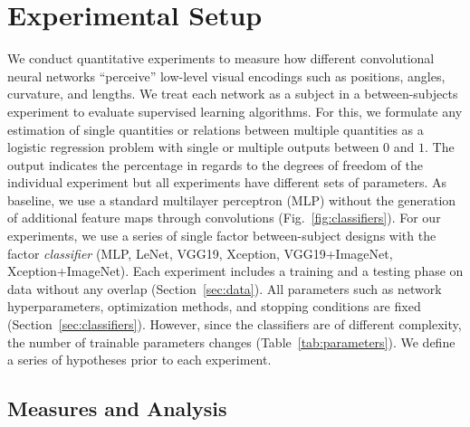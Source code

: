 
\section{Experimental Setup}

We conduct quantitative experiments to measure how different convolutional neural networks ``perceive'' low-level visual encodings such as positions, angles, curvature, and lengths. We treat each network as a subject in a between-subjects experiment to evaluate supervised learning algorithms. For this, we formulate any estimation of single quantities or relations between multiple quantities as a logistic regression problem with single or multiple outputs between $0$ and $1$. The output indicates the percentage in regards to the degrees of freedom of the individual experiment but all experiments have different sets of parameters. As baseline, we use a standard multilayer perceptron (MLP) without the generation of additional feature maps through convolutions (Fig.~\ref{fig:classifiers}).
For our experiments, we use a series of single factor between-subject designs with the factor \emph{classifier} (MLP, LeNet, VGG19, Xception, VGG19+ImageNet, Xception+ImageNet). Each experiment includes a training and a testing phase on data without any overlap (Section~\ref{sec:data}). All parameters such as network hyperparameters, optimization methods, and stopping conditions are fixed (Section~\ref{sec:classifiers}). However, since the classifiers are of different complexity, the number of trainable parameters changes (Table~\ref{tab:parameters}). We define a series of hypotheses prior to each experiment.

\subsection{Measures and Analysis}

